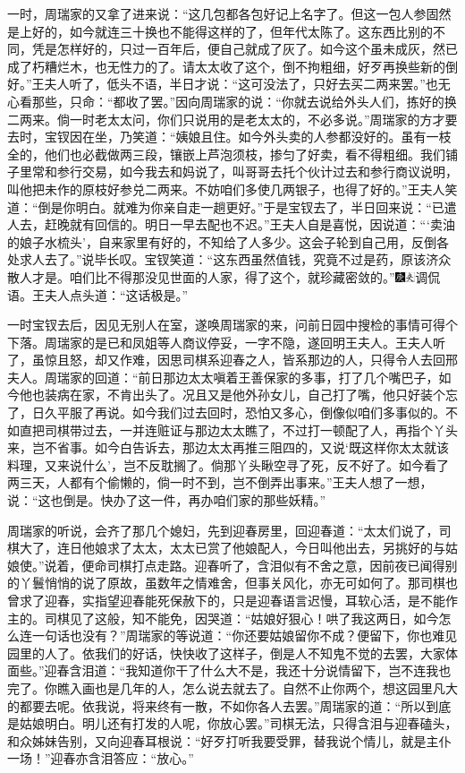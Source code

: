 一时，周瑞家的又拿了进来说：“这几包都各包好记上名字了。但这一包人参固然是上好的，如今就连三十换也不能得这样的了，但年代太陈了。这东西比别的不同，凭是怎样好的，只过一百年后，便自己就成了灰了。如今这个虽未成灰，然已成了朽糟烂木，也无性力的了。请太太收了这个，倒不拘粗细，好歹再换些新的倒好。”王夫人听了，低头不语，半日才说：“这可没法了，只好去买二两来罢。”也无心看那些，只命：“都收了罢。”因向周瑞家的说：“你就去说给外头人们，拣好的换二两来。倘一时老太太问，你们只说用的是老太太的，不必多说。”周瑞家的方才要去时，宝钗因在坐，乃笑道：“姨娘且住。如今外头卖的人参都没好的。虽有一枝全的，他们也必截做两三段，镶嵌上芦泡须枝，掺匀了好卖，看不得粗细。我们铺子里常和参行交易，如今我去和妈说了，叫哥哥去托个伙计过去和参行商议说明，叫他把未作的原枝好参兑二两来。不妨咱们多使几两银子，也得了好的。”王夫人笑道：“倒是你明白。就难为你亲自走一趟更好。”于是宝钗去了，半日回来说：“已遣人去，赶晚就有回信的。明日一早去配也不迟。”王夫人自是喜悦，因说道：“‘卖油的娘子水梳头’，自来家里有好的，不知给了人多少。这会子轮到自己用，反倒各处求人去了。”说毕长叹。宝钗笑道：“这东西虽然值钱，究竟不过是药，原该济众散人才是。咱们比不得那没见世面的人家，得了这个，就珍藏密敛的。”{\includegraphics[width=3mm]{../Images/00004}\includegraphics[width=3mm]{../Images/00012}\footnotesize \kaishu 调侃语。}王夫人点头道：“这话极是。”

一时宝钗去后，因见无别人在室，遂唤周瑞家的来，问前日园中搜检的事情可得个下落。周瑞家的是已和凤姐等人商议停妥，一字不隐，遂回明王夫人。王夫人听了，虽惊且怒，却又作难，因思司棋系迎春之人，皆系那边的人，只得令人去回邢夫人。周瑞家的回道：“前日那边太太嗔着王善保家的多事，打了几个嘴巴子，如今他也装病在家，不肯出头了。况且又是他外孙女儿，自己打了嘴，他只好装个忘了，日久平服了再说。如今我们过去回时，恐怕又多心，倒像似咱们多事似的。不如直把司棋带过去，一并连赃证与那边太太瞧了，不过打一顿配了人，再指个丫头来，岂不省事。如今白告诉去，那边太太再推三阻四的，又说‘既这样你太太就该料理，又来说什么’，岂不反耽搁了。倘那丫头瞅空寻了死，反不好了。如今看了两三天，人都有个偷懒的，倘一时不到，岂不倒弄出事来。”王夫人想了一想，说：“这也倒是。快办了这一件，再办咱们家的那些妖精。”

周瑞家的听说，会齐了那几个媳妇，先到迎春房里，回迎春道：“太太们说了，司棋大了，连日他娘求了太太，太太已赏了他娘配人，今日叫他出去，另挑好的与姑娘使。”说着，便命司棋打点走路。迎春听了，含泪似有不舍之意，因前夜已闻得别的丫鬟悄悄的说了原故，虽数年之情难舍，但事关风化，亦无可如何了。那司棋也曾求了迎春，实指望迎春能死保赦下的，只是迎春语言迟慢，耳软心活，是不能作主的。司棋见了这般，知不能免，因哭道：“姑娘好狠心！哄了我这两日，如今怎么连一句话也没有？”周瑞家的等说道：“你还要姑娘留你不成？便留下，你也难见园里的人了。依我们的好话，快快收了这样子，倒是人不知鬼不觉的去罢，大家体面些。”迎春含泪道：“我知道你干了什么大不是，我还十分说情留下，岂不连我也完了。你瞧入画也是几年的人，怎么说去就去了。自然不止你两个，想这园里凡大的都要去呢。依我说，将来终有一散，不如你各人去罢。”周瑞家的道：“所以到底是姑娘明白。明儿还有打发的人呢，你放心罢。”司棋无法，只得含泪与迎春磕头，和众姊妹告别，又向迎春耳根说：“好歹打听我要受罪，替我说个情儿，就是主仆一场！”迎春亦含泪答应：“放心。”

